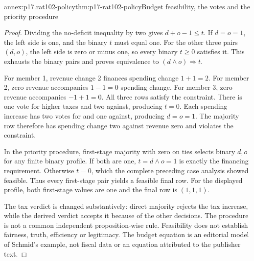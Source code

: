 \begin{annexitem}{annex:p17.rat102-policy}{thm:p17-rat102-policy}{Budget feasibility, the votes and the priority procedure}
\begin{proof}
Dividing the no-deficit inequality by two gives \(d+o-1\leq t\).
If \(d=o=1\), the left side is one, and the binary \(t\) must
equal one. For the other three pairs \((d,o)\), the left side is
zero or minus one, so every binary \(t\geq0\) satisfies it.
This exhausts the binary pairs and proves equivalence to
\((d\land o)\Rightarrow t\).

For member 1, revenue change 2 finances spending change \(1+1=2\).
For member 2, zero revenue accompanies \(1-1=0\) spending change.
For member 3, zero revenue accompanies \(-1+1=0\). All three rows
satisfy the constraint. There is one vote for higher taxes and two
against, producing \(t=0\). Each spending increase has two votes
for and one against, producing \(d=o=1\). The majority row therefore
has spending change two against revenue zero and violates the constraint.

In the priority procedure, first-stage majority with zero on ties selects
binary \(d,o\) for any finite binary profile. If both are one,
\(t=d\land o=1\) is exactly the financing requirement. Otherwise
\(t=0\), which the complete preceding case analysis showed feasible.
Thus every first-stage pair yields a feasible final row. For the displayed
profile, both first-stage values are one and the final row is \((1,1,1)\).

The tax verdict is changed substantively: direct majority rejects the tax
increase, while the derived verdict accepts it because of the other
decisions. The procedure is not a common independent proposition-wise
rule. Feasibility does not establish fairness, truth, efficiency or
legitimacy. The budget equation is an editorial model of Schmid's
example, not fiscal data or an equation attributed to the publisher text.
\end{proof}
\end{annexitem}
